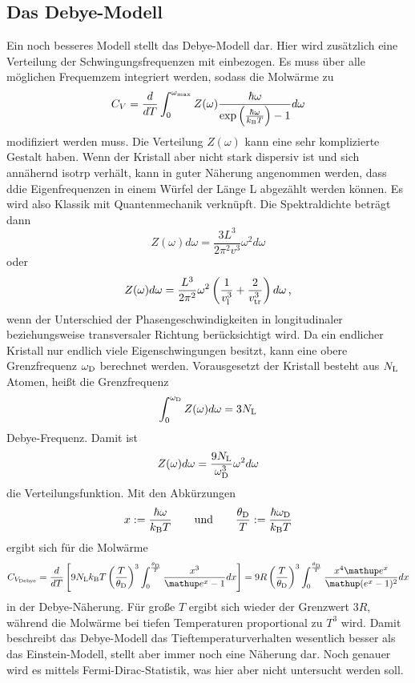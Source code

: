 \subsection{Das Debye-Modell}
Ein noch besseres Modell stellt das Debye-Modell dar. Hier wird zusätzlich eine Verteilung der Schwingungsfrequenzen mit einbezogen. Es muss über alle möglichen Frequemzem integriert werden, sodass die Molwärme zu
\begin{equation}
	C_V = \frac{d}{dT}\int_0^{\omega_\text{max}} Z(\omega) \frac{\hbar\omega}{\exp{\left(\frac{\hbar\omega}{k_\text B T}\right)} - 1} d\omega
	\label{eqn:cvn}
\end{equation}
modifiziert werden muss.
Die Verteilung $Z(\omega)$ kann eine sehr komplizierte Gestalt haben. Wenn der Kristall aber nicht stark dispersiv ist und sich annähernd isotrp verhält, kann in guter Näherung angenommen werden, dass ddie Eigenfrequenzen in einem Würfel der Länge L abgezählt werden können.
Es wird also Klassik mit Quantenmechanik verknüpft.
Die Spektraldichte beträgt dann
\begin{equation*}
	Z(\omega)d\omega = \frac{3L^3}{2\pi^2v^3}\omega^2 d\omega
\end{equation*}
oder
\begin{equation}
	Z(\omega)d\omega = \frac{L^3}{2\pi^2}\omega^2\left(\frac{1}{v_\text{l}^3}+\frac{2}{v_{\text{tr}}^3}\right)d\omega
	\label{eqn:z}\,\text,
\end{equation}
wenn der Unterschied der Phasengeschwindigkeiten in longitudinaler beziehungsweise transversaler Richtung berücksichtigt wird.
Da ein endlicher Kristall nur endlich viele Eigenschwingungen besitzt, kann eine obere Grenzfrequenz $\omega_\text D$ berechnet werden. Vorausgesetzt der Kristall besteht aus $N_\text L$ Atomen, heißt die Grenzfrequenz
\begin{equation}
	\int_0^{\omega_\text D} Z(\omega) d\omega = 3 N_\text L
	\label{eqn:wd}
\end{equation}
Debye-Frequenz.
Damit ist 
\begin{equation}
	Z(\omega)d\omega = \frac{9 N_\text L}{\omega_\text D ^3}\omega^2 d\omega
	\label{eqn:z2}
\end{equation}
die Verteilungsfunktion.
Mit den Abkürzungen
\begin{equation*}
	x := \frac{\hbar\omega}{k_\text B T}\qquad\text{und}\qquad \frac{\theta_\text D}{T} :=\frac{\hbar\omega_\text D }{k_\text B T}
\end{equation*}
ergibt sich für die Molwärme
\begin{equation}
	C_{V_\text{Debye}} = \frac{d}{dT}\left[9 N_\text L k_\text B T \left(\frac{T}{\theta_\text D}\right)^3 \int_0^{\frac{\theta_\text D}{T}} \frac{x^3}{\mathup e^x -1} dx \right] = 9 R \left(\frac{T}{\theta_\text D}\right)^3 \int_0^{\frac{\theta_\text D}{T}} \frac{x^4\mathup e^x}{\mathup (e^x -1)^2} dx
	\label{eqn:cvd}
\end{equation}
in der Debye-Näherung.
Für große $T$ ergibt sich wieder der Grenzwert $3R$, während die Molwärme bei tiefen Temperaturen  proportional zu $T^3$ wird. Damit beschreibt das Debye-Modell das Tieftemperaturverhalten wesentlich besser als das Einstein-Modell, stellt aber immer noch eine Näherung dar. Noch genauer wird es mittels Fermi-Dirac-Statistik, was hier aber nicht untersucht werden soll.